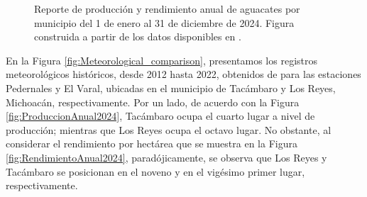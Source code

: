 \begin{figure}[ht]
\centering
{}
\hfill
{}
\caption{Reporte de producción y rendimiento anual de aguacates por municipio del 1 de enero al 31 de diciembre de 2024. Figura construida a partir de los datos disponibles en \cite{AvanceSiembrasCosechas}.}
\label{fig:Reporte2024}
\end{figure}



En la Figura \ref{fig:Meteorological_comparison}, presentamos los registros meteorológicos históricos, desde 2012 hasta 2022, obtenidos de \cite{Rodriguez-Moreno_2021} para las estaciones Pedernales y El Varal, ubicadas en el municipio de Tacámbaro y Los Reyes, Michoacán, respectivamente. Por un lado, de acuerdo con la Figura \ref{fig:ProduccionAnual2024}, Tacámbaro ocupa el cuarto lugar a  nivel de producción; mientras que Los Reyes ocupa el octavo lugar. No obstante, al considerar el rendimiento por hectárea que se muestra en la Figura \ref{fig:RendimientoAnual2024}, paradójicamente, se observa que Los Reyes y Tacámbaro se posicionan en el noveno y en el vigésimo primer lugar, respectivamente.\\


